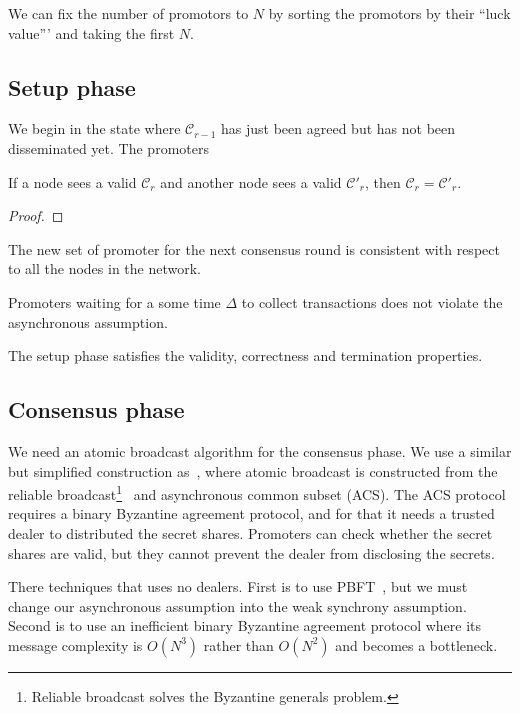 We can fix the number of promotors to $N$ by sorting the promotors by their
``luck value''' and taking the first $N$.

\subsection{Setup phase}
We begin in the state where $\mathcal{C}_{r-1}$ has just been agreed but has not
been disseminated yet. The promoters 

\begin{lemma}
  If a node sees a valid $\mathcal{C}_r$ and another node sees a valid
  $\mathcal{C}'_r$, then $\mathcal{C}_r = \mathcal{C}'_r$.
\end{lemma}
\begin{proof}
\end{proof}

\begin{lemma}
  The new set of promoter for the next consensus round is consistent with
  respect to all the nodes in the network.
\end{lemma}

\begin{lemma}
  Promoters waiting for a some time $\Delta$ to collect transactions does not
  violate the asynchronous assumption.
\end{lemma}

\begin{corollary}
  The setup phase satisfies the validity, correctness and termination
  properties.
\end{corollary}

\subsection{Consensus phase}
We need an atomic broadcast algorithm for the consensus phase. We use a similar
but simplified construction as~\cite{miller2016honey}, where atomic broadcast is
constructed from the reliable broadcast\footnote{Reliable broadcast solves the
  Byzantine generals problem.}~\cite{bracha1984asynchronous} and asynchronous
common subset (ACS). The ACS protocol requires a binary Byzantine agreement
protocol, and for that it needs a trusted dealer to distributed the secret
shares. Promoters can check whether the secret shares are valid, but they cannot
prevent the dealer from disclosing the secrets.

There techniques that uses no dealers. First is to use
PBFT~\cite{castro1999practical}, but we must change our asynchronous assumption
into the weak synchrony assumption. Second is to use an inefficient binary
Byzantine agreement protocol where its message complexity is $O(N^3)$ rather
than $O(N^2)$ and becomes a bottleneck.

